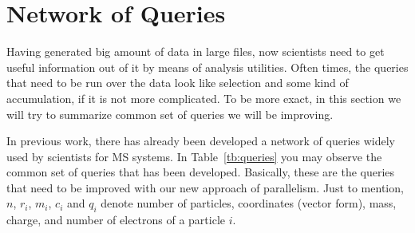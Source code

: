 \documentclass[10pt,journal,final,letterpaper,twocolumn]{IEEEtran}
\begin{document}

\vspace{3mm}
\section{Network of Queries}\label{sc:querynetwork}
\vspace{3mm}

Having generated big amount of data in large files, now scientists need to get useful information out of it by means of analysis utilities. Often times, the queries that need to be run over the data look like selection and some kind of accumulation, if it is not more complicated. To be more exact, in this section we will try to summarize common set of queries we will be improving. 

In previous work, there has already been developed a network of queries widely used by scientists for MS systems. In Table~\ref{tb:queries} you may observe the common set of queries that has been developed. Basically, these are the queries that need to be improved with our new approach of parallelism. Just to mention, $n$, $r_i$, $m_i$, $c_i$ and $q_i$ denote number of particles, coordinates (vector form), mass, charge, and number of electrons of a particle $i$.
\end{document}
